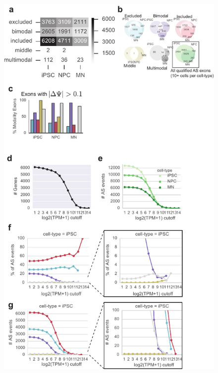 \begin{figure}[h]
\ContinuedFloat
\captionsetup{labelformat=empty}
\centering
\includegraphics[width=5.8in]{figures/anchor_supplementary.pdf}
\end{figure}
\clearpage



